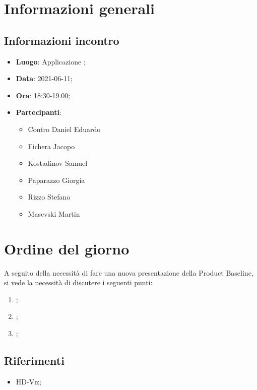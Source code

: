 \documentclass{article}
\begin{document}


\section{Informazioni generali}
\label{sec:info_generali}

\subsection{Informazioni incontro}
\label{sub:info_incontro}

\begin{itemize}
	\item \textbf{Luogo}: Applicazione ;
	\item \textbf{Data}: 2021-06-11;
	\item \textbf{Ora}: 18:30-19.00;
	\item \textbf{Partecipanti}:
	\begin{itemize}
		\item Contro Daniel Eduardo
		\item Fichera Jacopo
		\item Kostadinov Samuel
		\item Paparazzo Giorgia
		\item Rizzo Stefano
		\item Masevski Martin
	\end{itemize}
\end{itemize}

\section{Ordine del giorno}%
\label{sec:ordine_del_giorno}
A seguito della necessità di fare una nuova presentazione della Product Baseline, si vede la necessità di discutere i seguenti punti:
\begin{enumerate}
	\item {};
	\item {};
	\item {};
\end{enumerate}


\subsection{Riferimenti}%
\label{sub:riferimenti}
\begin{itemize}
    \item \textsc{HD-Viz};
    \end{itemize}
\end{document}
